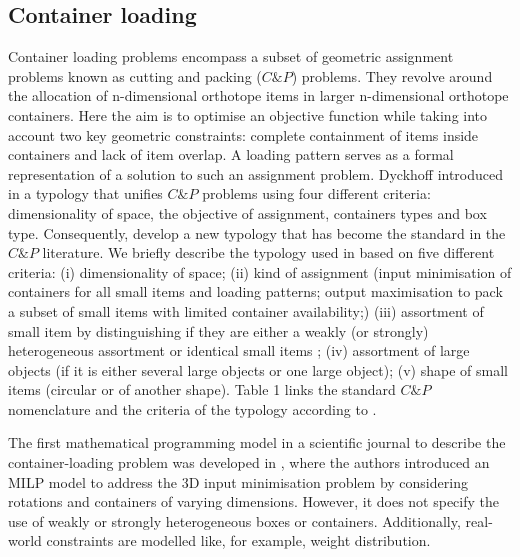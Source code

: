 \subsection{Container loading}

Container loading problems encompass a subset of geometric assignment problems known as cutting and packing ($C\&P$) problems. They revolve around the allocation of n-dimensional orthotope items in larger n-dimensional orthotope containers. Here the aim is to optimise an objective function while taking into account two key geometric constraints: complete containment of items inside containers and lack of item overlap. A loading pattern serves as a formal representation of a solution to such an assignment problem.
Dyckhoff introduced in \autocite{Dyckhoff1990AProblems} a typology that unifies $C\&P$ problems using four different criteria: dimensionality of space, the objective of assignment, containers types and box type. Consequently, \autocite{Wascher2007AnProblems} develop a new typology that has become the standard in the $C\&P$ literature. We   briefly  describe  the  typology  used  in  \autocite{Wascher2007AnProblems}  based  on  five different criteria: (i) dimensionality of space; (ii) kind of assignment (input minimisation of containers for all small items and loading patterns; output maximisation to pack a subset of small items with limited container availability;) (iii) assortment of small item by distinguishing if they are either a weakly (or strongly) heterogeneous assortment or identical small items ; (iv) assortment of large objects (if it is either several large objects or one large object); (v) shape of small items (circular or of another shape). Table 1 links the standard $C\&P$ nomenclature and the criteria of the typology according to \autocite{Wascher2007AnProblems}.





The first mathematical programming model in a scientific journal to describe the container-loading problem was developed in \autocite{Chen1995EUROPEANProblem}, where the authors introduced an MILP model to address the 3D  input minimisation problem by considering rotations and containers of varying dimensions. However, it does not specify the use of weakly or strongly heterogeneous boxes or containers. Additionally, real-world constraints are modelled like, for example, weight distribution.

